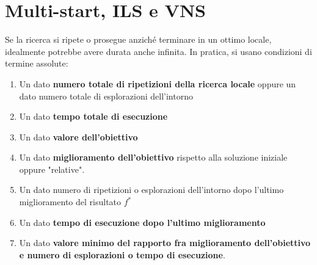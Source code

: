 \documentclass[\main/main.tex]{subfiles}
\begin{document}
\chapter{Multi-start, ILS e VNS}
\begin{definition}
    Se la ricerca si ripete o prosegue anziché terminare in un ottimo locale, idealmente potrebbe avere durata anche infinita. In pratica, si usano condizioni di termine assolute:
    \begin{enumerate}
        \item Un dato \textbf{numero totale di ripetizioni della ricerca locale} oppure un dato numero totale di esplorazioni dell'intorno
        \item Un dato \textbf{tempo totale di esecuzione}
        \item Un dato \textbf{valore dell'obiettivo}
        \item Un dato \textbf{miglioramento dell'obiettivo} rispetto alla soluzione iniziale oppure "relative".
        \item Un dato numero di ripetizioni o esplorazioni dell'intorno dopo l’ultimo miglioramento del risultato \(f^*\)
        \item Un dato \textbf{tempo di esecuzione dopo l’ultimo miglioramento}
        \item Un dato \textbf{valore minimo del rapporto fra miglioramento dell'obiettivo e numero di esplorazioni o tempo di esecuzione}.
    \end{enumerate}
\end{definition}
\end{document}
